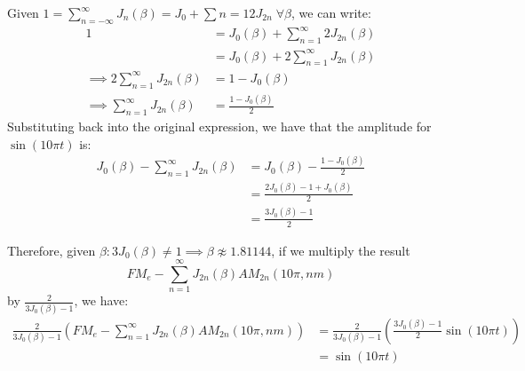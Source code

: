 \documentclass[11pt,twoside]{report}
\numberwithin{thm}{section}
\numberwithin{equation}{section}
\begin{document}
Given $1 = \sum_{n=-\infty}^\infty J_n(\beta) = J_0 + \sum{n=1} 2J_{2n} \; \forall \beta$, we can write:
\begin{align*}
    1 &= J_0(\beta) + \sum_{n=1}^\infty 2J_{2n}(\beta) \\
    &= J_0(\beta) + 2\sum_{n=1}^\infty J_{2n}(\beta) \\
    \implies 2\sum_{n=1}^\infty J_{2n}(\beta) &= 1 - J_0(\beta)\\
    \implies \sum_{n=1}^\infty J_{2n}(\beta) &= \frac{1- J_0(\beta)}{2}
\end{align*}
Substituting back into the original expression, we have that the amplitude for $\sin(10\pi t)$ is:
\begin{align*}
    J_0(\beta) - \sum_{n=1}^\infty J_{2n}(\beta) &= J_0(\beta) - \frac{1- J_0(\beta)}{2}\\
    &= \frac{2J_0(\beta) - 1 + J_0(\beta)}{2}\\
    &= \frac{3J_0(\beta) - 1}{2}
\end{align*}

Therefore, given $\beta : 3J_0(\beta) \neq 1 \implies \beta \not\approx 1.81144$, if we multiply the result \\
$$FM_e - \sum_{n=1}^\infty J_{2n}(\beta)AM_{2n}(10\pi, nm)$$
by $\displaystyle\frac{2}{3J_0(\beta) - 1}$, we have:
\begin{align*}
    \frac{2}{3J_0(\beta) - 1}\left(FM_e - \sum_{n=1}^\infty J_{2n}(\beta)AM_{2n}(10\pi, nm)\right) &= \frac{2}{3J_0(\beta) - 1}\left(\frac{3J_0(\beta) - 1}{2}\sin(10\pi t)\right)\\
    &= \sin(10\pi t) 
\end{align*}



\clearpage
{}



	




%
%
\end{document}
